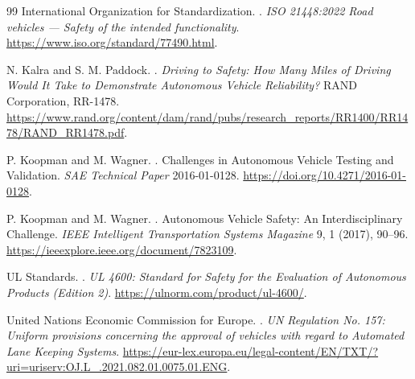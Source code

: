 \documentclass[sigconf,nonacm]{acmart}
\begin{document}
\begin{thebibliography}{99}
International Organization for Standardization.
.
\newblock \textit{ISO 21448:2022 Road vehicles --- Safety of the intended functionality}.
\newblock \url{https://www.iso.org/standard/77490.html}.

N. Kalra and S. M. Paddock.
.
\newblock \textit{Driving to Safety: How Many Miles of Driving Would It Take to Demonstrate Autonomous Vehicle Reliability?}
\newblock RAND Corporation, RR-1478.
\newblock \url{https://www.rand.org/content/dam/rand/pubs/research_reports/RR1400/RR1478/RAND_RR1478.pdf}.

P. Koopman and M. Wagner.
.
\newblock Challenges in Autonomous Vehicle Testing and Validation.
\newblock \textit{SAE Technical Paper} 2016-01-0128.
\newblock \url{https://doi.org/10.4271/2016-01-0128}.

P. Koopman and M. Wagner.
.
\newblock Autonomous Vehicle Safety: An Interdisciplinary Challenge.
\newblock \textit{IEEE Intelligent Transportation Systems Magazine} 9, 1 (2017), 90--96.
\newblock \url{https://ieeexplore.ieee.org/document/7823109}.

UL Standards.
.
\newblock \textit{UL 4600: Standard for Safety for the Evaluation of Autonomous Products (Edition 2)}.
\newblock \url{https://ulnorm.com/product/ul-4600/}.

United Nations Economic Commission for Europe.
.
\newblock \textit{UN Regulation No. 157: Uniform provisions concerning the approval of vehicles with regard to Automated Lane Keeping Systems}.
\newblock \url{https://eur-lex.europa.eu/legal-content/EN/TXT/?uri=uriserv:OJ.L_.2021.082.01.0075.01.ENG}.
\end{thebibliography}
\end{document}

